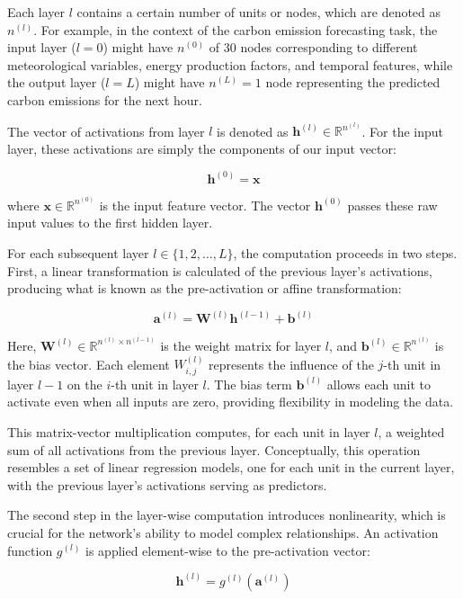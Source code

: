 Each layer \(l\) contains a certain number of units or nodes, which are denoted as \(n^{(l)}\). For example, in the context of the carbon emission forecasting task, the input layer (\(l=0\)) might have \(n^{(0)}\) of 30 nodes corresponding to different meteorological variables, energy production factors, and temporal features, while the output layer (\(l=L\)) might have \(n^{(L)}=1\) node representing the predicted carbon emissions for the next hour.

The vector of activations from layer \(l\) is denoted as \(\mathbf{h}^{(l)} \in \mathbb{R}^{n^{(l)}}\). For the input layer, these activations are simply the components of our input vector:

\[
  \mathbf{h}^{(0)} = \mathbf{x}
\]

where \(\mathbf{x} \in \mathbb{R}^{n^{(0)}}\) is the input feature vector. The vector \(\mathbf{h}^{(0)}\) passes these raw input values to the first hidden layer.

For each subsequent layer \(l \in \{1, 2, \ldots, L\}\), the computation proceeds in two steps. First, a linear transformation is calculated of the previous layer's activations, producing what is known as the pre-activation or affine transformation:

\[
  \mathbf{a}^{(l)} = \mathbf{W}^{(l)}\mathbf{h}^{(l-1)} + \mathbf{b}^{(l)}
\]

Here, \(\mathbf{W}^{(l)} \in \mathbb{R}^{n^{(l)} \times n^{(l-1)}}\) is the weight matrix for layer \(l\), and \(\mathbf{b}^{(l)} \in \mathbb{R}^{n^{(l)}}\) is the bias vector. Each element \(W^{(l)}_{i,j}\) represents the influence of the \(j\)-th unit in layer \(l-1\) on the \(i\)-th unit in layer \(l\). The bias term \(\mathbf{b}^{(l)}\) allows each unit to activate even when all inputs are zero, providing flexibility in modeling the data.

This matrix-vector multiplication computes, for each unit in layer \(l\), a weighted sum of all activations from the previous layer. Conceptually, this operation resembles a set of linear regression models, one for each unit in the current layer, with the previous layer's activations serving as predictors.

The second step in the layer-wise computation introduces nonlinearity, which is crucial for the network's ability to model complex relationships. An activation function \(g^{(l)}\) is applied element-wise to the pre-activation vector:

\[
  \mathbf{h}^{(l)} = g^{(l)}(\mathbf{a}^{(l)})
\]

